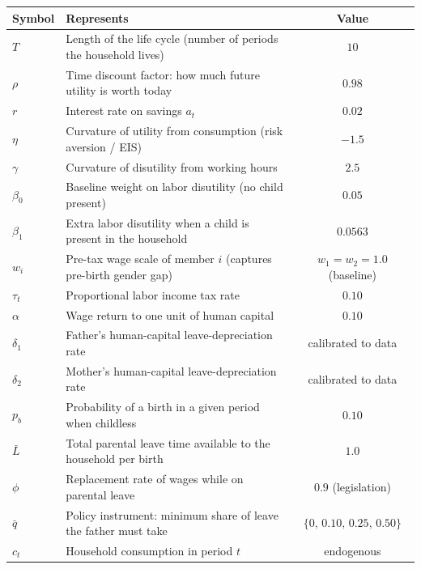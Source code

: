 \begin{table}[h]
\centering
\small
\begin{tabular}{@{}llc@{}}
\toprule
\textbf{Symbol} & \textbf{Represents} & \textbf{Value} \\
\midrule
$T$            & Length of the life cycle (number of periods the household lives) & $10$ \\
$\rho$         & Time discount factor: how much future utility is worth today      & $0.98$ \\
$r$            & Interest rate on savings $a_t$                                    & $0.02$ \\
$\eta$         & Curvature of utility from consumption (risk aversion / EIS)       & $-1.5$ \\
$\gamma$       & Curvature of disutility from working hours                        & $2.5$ \\
$\beta_0$      & Baseline weight on labor disutility (no child present)            & $0.05$ \\
$\beta_1$      & Extra labor disutility when a child is present in the household   & $0.0563$ \\
$w_i$          & Pre-tax wage scale of member $i$ (captures pre-birth gender gap)  & $w_1 = w_2 = 1.0$ (baseline) \\
$\tau_t$       & Proportional labor income tax rate                                & $0.10$ \\
$\alpha$       & Wage return to one unit of human capital                          & $0.10$ \\
$\delta_1$     & Father's human-capital leave-depreciation rate                    & calibrated to data \\
$\delta_2$     & Mother's human-capital leave-depreciation rate                    & calibrated to data \\
$p_b$          & Probability of a birth in a given period when childless           & $0.10$ \\
$\bar{L}$      & Total parental leave time available to the household per birth    & $1.0$ \\
$\phi$         & Replacement rate of wages while on parental leave                 & $0.9$ (legislation) \\
$\bar{q}$      & Policy instrument: minimum share of leave the father must take    & $\{0,\,0.10,\,0.25,\,0.50\}$ \\
\midrule
$c_t$          & Household consumption in period $t$                                  & endogenous \\

\end{tabular}
\end{table}

